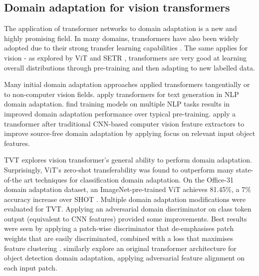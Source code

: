 \documentclass[a4paper,12pt]{report}
\begin{document}
    \subsection{Domain adaptation for vision transformers}
    
    The application of transformer networks to domain adaptation is a new and highly promising field. In many domains, transformers have also been widely adopted due to their strong transfer learning capabilities \cite{radford_language_2019} \cite{wright_transformer_2020}. The same applies for vision - as explored by ViT \cite{dosovitskiy_image_2021} and SETR \cite{zheng_rethinking_2021}, transformers are very good at learning overall distributions through pre-training and then adapting to new labelled data.
    
    Many initial domain adaptation approaches applied transformers tangentially or to non-computer vision fields. \cite{shakeri_end--end_2020} apply transformers for text generation in NLP domain adaptation. \cite{liu_multi-task_2019} find training models on multiple NLP tasks results in improved domain adaptation performance over typical pre-training. \cite{yang_transformer-based_2021} apply a transformer after traditional CNN-based computer vision feature extractors to improve source-free domain adaptation by applying focus on relevant input object features. 
    
    TVT \cite{yang_tvt_2021} explores vision transformer’s general ability to perform domain adaptation. Surprisingly, ViT’s zero-shot transferability was found to outperform many state-of-the art techniques for classification domain adaptation. On the Office-31 \cite{saenko_adapting_2010} domain adaptation dataset, an ImageNet-pre-trained ViT achieves 81.45\%, a 7\% accuracy increase over SHOT \cite{liang_we_2021}. Multiple domain adaptation modifications were evaluated for TVT. Applying an adversarial domain discriminator on class token output (equivalent to CNN features) provided some improvements. Best results were seen by applying a patch-wise discriminator that de-emphasises patch weights that are easily discriminated, combined with a loss that maximises feature clustering \cite{chapelle_semi-supervised_2005}. \cite{wang_exploring_2021} similarly explore an original transformer architecture for object detection domain adaptation, applying adversarial feature alignment on each input patch.
    
\end{document}
